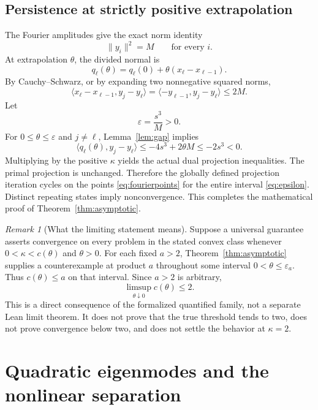 \documentclass[11pt]{article}
\theoremstyle{remark}\newtheorem{remark}[theorem]{Remark}
\newcommand{\ip}[2]{\langle #1,#2\rangle}
\newcommand{\norm}[1]{\lVert #1\rVert}
\begin{document}
\subsection{Persistence at strictly positive extrapolation}

The Fourier amplitudes give the exact norm identity
\[
 \norm{y_i}^2=M\qquad\text{for every }i.
\]
At extrapolation $\theta$, the divided normal is
\[
 q_\ell(\theta)=q_\ell(0)+\theta(x_\ell-x_{\ell-1}).
\]
By Cauchy--Schwarz, or by expanding two nonnegative squared norms,
\[
 \ip{x_\ell-x_{\ell-1}}{y_j-y_\ell}
   =\ip{-y_{\ell-1}}{y_j-y_\ell}\le2M.
\]
Let
\begin{equation}\label{eq:epsilon}
 \varepsilon=\frac{s^3}{M}>0.
\end{equation}
For $0\le\theta\le\varepsilon$ and $j\ne\ell$, Lemma~\ref{lem:gap} implies
\[
 \ip{q_\ell(\theta)}{y_j-y_\ell}
     \le-4s^3+2\theta M\le-2s^3<0.
\]
Multiplying by the positive $\kappa$ yields the actual dual projection inequalities. The primal projection is unchanged. Therefore the globally defined projection iteration cycles on the points \eqref{eq:fourierpoints} for the entire interval \eqref{eq:epsilon}. Distinct repeating states imply nonconvergence. This completes the mathematical proof of Theorem~\ref{thm:asymptotic}.

\begin{remark}[What the limiting statement means]
Suppose a universal guarantee asserts convergence on every problem in the stated convex class whenever $0<\kappa<c(\theta)$ and $\theta>0$. For each fixed $a>2$, Theorem~\ref{thm:asymptotic} supplies a counterexample at product $a$ throughout some interval $0<\theta\le\varepsilon_a$. Thus $c(\theta)\le a$ on that interval. Since $a>2$ is arbitrary,
\[
 \limsup_{\theta\downarrow0}c(\theta)\le2.
\]
This is a direct consequence of the formalized quantified family, not a separate Lean limit theorem. It does not prove that the true threshold tends to two, does not prove convergence below two, and does not settle the behavior at $\kappa=2$.
\end{remark}

\section{Quadratic eigenmodes and the nonlinear separation}\label{sec:quad}
\end{document}

